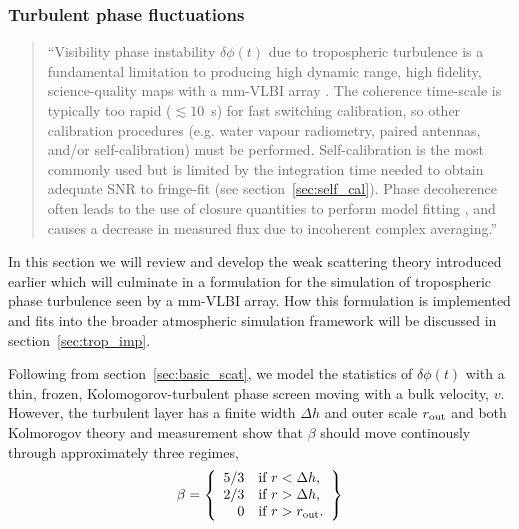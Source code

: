 \subsubsection{Turbulent phase fluctuations}\label{sec:turb_theory}

\begin{quotation}
``Visibility phase instability  $\delta \phi(t)$ due to tropospheric turbulence is a fundamental limitation to producing high dynamic range, high fidelity, science-quality maps with a mm-VLBI array \citep{Thompson_2001}. The coherence time-scale is typically too rapid ($\lesssim10$~s) for fast switching calibration, so other calibration procedures (e.g. water vapour radiometry, paired antennas, and/or self-calibration) must be performed. Self-calibration is the most commonly used but is limited by the integration time needed to obtain adequate SNR to fringe-fit (see section~\ref{sec:self_cal}). Phase decoherence often leads to the use of closure quantities to perform model fitting \citep{Doeleman_2001,Bower_2004, Shen_2005}, and causes a decrease in measured flux due to incoherent complex averaging.''\\
\citep{Blecher_2016}
\end{quotation}

In this section we will review and develop the weak scattering theory introduced earlier which will culminate in a formulation for the simulation of tropospheric phase turbulence seen by a mm-VLBI array. How this formulation is implemented and fits into the broader atmospheric simulation framework will be discussed in section~\ref{sec:trop_imp}. 


Following from section~\ref{sec:basic_scat}, we model the statistics of $\delta \phi(t)$ with a thin, frozen, Kolomogorov-turbulent phase screen moving with a bulk velocity, $v$. 
However, the turbulent layer has a finite width $\Delta h$ and outer scale $r_{\rm out}$ and both Kolmorogov theory and measurement \citep[Fig.~\ref{fig:screentransition},][]{Coulman_1985, Treuhaft_1987, Carilli_1997} show that $\beta$ should move continously through approximately three regimes,
\begin{equation}
 \beta = \left\{
 \begin{array}{rl}
 5/3 & \text{if } r < \Delta h,\\
2/3 & \text{if } r > \Delta h,\\
0 & \text{if } r > r_{\rm out}.
 \end{array}
\right\}
\end{equation}

